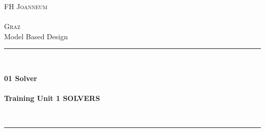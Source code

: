 \thispagestyle{empty}


\begin{titlepage}

	\begin{center}
	
	\textsc{
		\LARGE FH Joanneum\\~\\Graz}\\[1.5cm]
	\vfill{}
	\large Model Based Design
	\\[0.5cm]
	\newcommand{\HRule}{\rule{\linewidth}{0.5mm}}
	\HRule
	\\[0.4cm]
	{
	
		\Huge \bfseries 01 Solver \\
	        ~\\
	        \large Training Unit 1 SOLVERS }
	\\[0.4cm]
	\HRule
	\\[0.5cm]
	
	
	\vfill{}
	

\end{center}
\end{titlepage}
